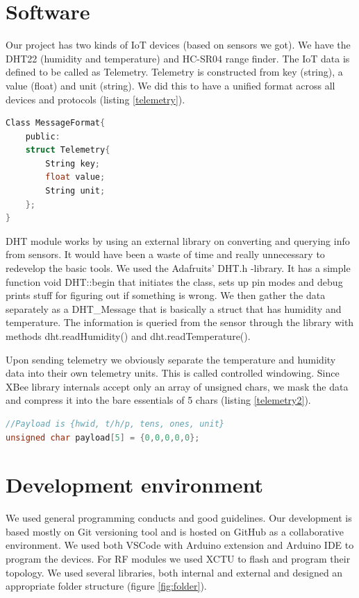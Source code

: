 \section{Software}
Our project has two kinds of IoT devices (based on sensors we got). We have the DHT22 (humidity and temperature) and HC-SR04 range finder. The IoT data is defined to be called as Telemetry. Telemetry is constructed from key (string), a value (float) and unit (string). We did this to have a unified format across all devices and protocols (listing \ref{telemetry}).

\begin{lstlisting}[language=C, caption=Message format, label=telemetry]
Class MessageFormat{
    public:
    struct Telemetry{
        String key;
        float value;
        String unit;
    };
}

\end{lstlisting}

DHT module works by using an external library on converting and querying info from sensors. It would have been a waste of time and really unnecessary to redevelop the basic tools. We used the Adafruits’ DHT.h -library. It has a simple function void DHT::begin that initiates the class, sets up pin modes and debug prints stuff for figuring out if something is wrong. We then gather the data separately as a DHT\_Message that is basically a struct that has humidity and temperature. The information is queried from the sensor through the library with methods dht.readHumidity() and dht.readTemperature(). 

Upon sending telemetry we obviously separate the temperature and humidity data into their own telemetry units. This is called controlled windowing. Since XBee library internals accept only an array of unsigned chars, we mask the data and compress it into the bare essentials of 5 chars (listing \ref{telemetry2}). 

\begin{lstlisting}[language=C, caption=Payload format, label=telemetry2]
//Payload is {hwid, t/h/p, tens, ones, unit}
unsigned char payload[5] = {0,0,0,0,0};
\end{lstlisting}

\section{Development environment}
We used general programming conducts and good guidelines. Our development is based mostly on Git versioning tool and is hosted on GitHub as a collaborative environment. We used both VSCode with Arduino extension and Arduino IDE to program the devices. For RF modules we used XCTU to flash and program their topology. We used several libraries, both internal and external and designed an appropriate folder structure (figure \ref{fig:folder}).

